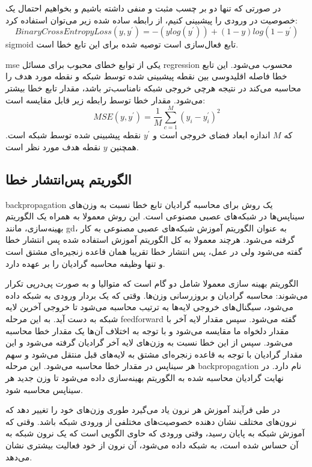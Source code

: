 در صورتی که تنها دو بر چسب مثبت و منفی داشته باشیم و بخواهیم احتمال یک خصوصیت در
ورودی را پیشبینی کنیم، از رابطه ساده شده زیر می‌توان استفاده کرد:
\begin{equation}
    BinaryCrossEntropyLoss(y, y^\prime) = -(y log(y^\prime)) + (1 - y)log(1 - y^\prime)
\end{equation}
sigmoid تابع فعال‌سازی است توصیه شده برای این تابع خطا است.

\gls{mse} یکی از توابع خطای محبوب برای مسائل \gls{regression} محسوب می‌شود. این
تابع خطا فاصله اقلیدوسی بین نقطه پیشبینی شده توسط شبکه و نقطه مورد هدف را محاسبه
می‌کند در نتیجه هرچی خروجی شبکه نامناسب‌تر باشد، مقدار تابع خطا بیشتر می‌شود.
مقدار خطا توسط رابطه زیر قابل مقایسه است:
\begin{equation}
    MSE(y, y^\prime) = \frac{1}{M} \sum_{c=1}^{M} (y_i - y_i^\prime)^2
\end{equation}
که $M$ اندازه ابعاد فضای خروجی است و $y^\prime$ نقطه پیشبینی شده توسط شبکه است.
همچنین $y$ نقطه هدف مورد نظر است.

\subsection{الگوریتم پس‌انتشار خطا}
\gls{backpropagation} یک روش برای محاسبه گرادیان تابع خطا نسبت به وزن‌های
سیناپس‌ها در شبکه‌های عصبی مصنوعی است. این روش معمولا به همراه یک الگوریتم
بهینه‌سازی، مانند \gls{gd}، به عنوان الگوریتم آموزش شبکه‌های عصبی مصنوعی به کار
گرفته می‌شود. هرچند معمولا به کل الگوریتم آموزش استفاده شده پس انتشار خطا گفته
می‌شود ولی در عمل، پس انتشار خطا تقریبا همان قاعده زنجیره‌ای مشتق است و تنها
وظیفه محاسبه گرادیان را بر عهده دارد.

الگوریتم بهینه سازی معمولا شامل دو گام است که متوالیا و به صورت پی‌در‌پی تکرار
می‌شوند: محاسبه گرادیان و بروزرسانی وزن‌ها. وقتی که یک بردار ورودی به شبکه داده
می‌شود، سیگنال‌های خروجی لایه‌ها به ترتیب محاسبه می‌شود تا خروجی آخرین لایه شبکه
به دست آید. به این مرحله \gls{feedforward} گفته می‌شود. سپس مقدار لایه آخر با
مقدار دلخواه ما مقایسه می‌شود و با توجه به اختلاف آن‌ها یک مقدار خطا محاسبه
می‌شود. سپس از این خطا نسبت به وزن‌های لایه آخر گرادیان گرفته می‌شود و این مقدار
گرادیان با توجه به قاعده زنجره‌ای مشتق به لایه‌های قبل منتقل می‌شود و سهم هر
سیناپس در مقدار خطا محاسبه می‌شود. این مرحله \gls{backpropagation} نام دارد. در
نهایت گرادیان محاسبه شده به الگوریتم بهینه‌سازی داده می‌شود تا وزن جدید هر
سیناپس محاسبه شود.

در طی فرآیند آموزش هر نرون یاد می‌گیرد طوری وزن‌های خود را تغییر دهد که نرون‌های
مختلف نشان دهنده خصوصیت‌های مختلفی از ورودی شبکه‌ باشد. وقتی که آموزش شبکه به
پایان رسید، وقتی ورودی که حاوی الگویی است که یک نرون شبکه به آن حساس شده است، به
شبکه داده می‌شود، آن نرون از خود فعالیت بیشتری نشان می‌دهد.

